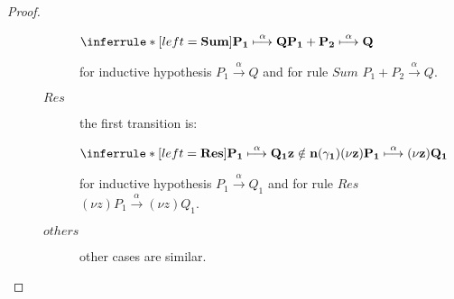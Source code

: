 \begin{proposition}
\begin{proof}
\begin{description}
\begin{description}
\begin{center}
	      $\inferrule* [left=\bf{Sum}]{
		P_{1} \stackrel{\alpha}{\longmapsto} Q
	      }{
		P_{1}+P_{2} \stackrel{\alpha}{\longmapsto} Q
	      }$ 
	    \end{center}
	    for inductive hypothesis $P_{1} \xrightarrow{\alpha} Q$ and for rule $Sum$ $P_{1}+P_{2} \xrightarrow{\alpha} Q$.
	  \item[$Res$] the first transition is:
	    \begin{center}
	      $\inferrule* [left=\bf{Res}]{
		  P_{1} \stackrel{\alpha}{\longmapsto} Q_{1}
		\\
		  z\notin n(\gamma_{1})
	      }{
		(\nu z) P_{1} \stackrel{\alpha}{\longmapsto} (\nu z)Q_{1}
	      }$ 
	    \end{center}		
	    for inductive hypothesis $P_{1} \xrightarrow{\alpha} Q_{1}$ and for rule $Res$ $(\nu z)P_{1} \xrightarrow{\alpha} (\nu z)Q_{1}$.
	 \item[$others$] other cases are similar.
      \end{description}	    
    \end{description}	    
  \end{proof}
\end{proposition}



